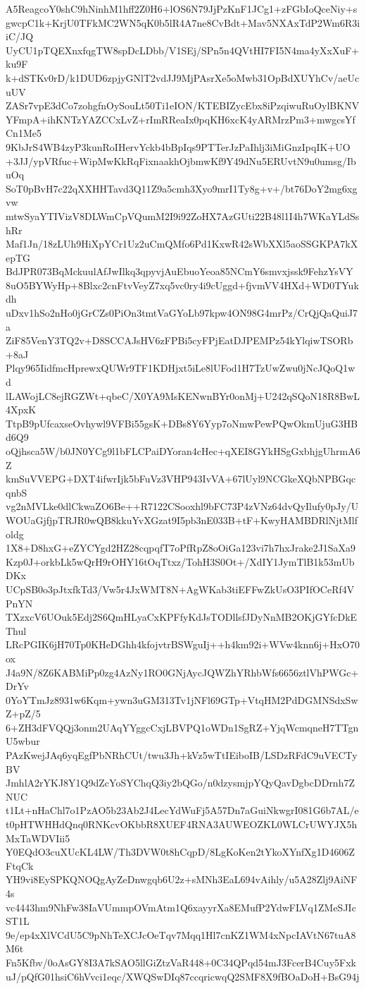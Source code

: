 A5ReagcoY0shC9hNinhM1hff2Z0H6+lOS6N79JjPzKnF1JCg1+zFGbIoQceNiy+s
gwcpC1k+KrjU0TFkMC2WN5qK0b5lR4A7ne8CvBdt+Mav5NXAxTdP2Wm6R3iiC/JQ
UyCU1pTQEXnxfqgTW8spDcLDbb/V1SEj/SPn5n4QVtHI7FI5N4ma4yXxXuF+ku9F
k+dSTKv0rD/k1DUD6zpjyGNlT2vdJJ9MjPAsrXe5oMwb31OpBdXUYhCv/aeUcuUV
ZASr7vpE3dCo7zohgfnOySouLt50Ti1eION/KTEBIZycEbx8iPzqiwuRuOylBKNV
YFmpA+ihKNTzYAZCCxLvZ+rImRReaIx0pqKH6xcK4yARMrzPm3+mwgcsYfCn1Me5
9KbJrS4WB4zyP3kunRoIHervYckb4bBpIqs9PTTerJzPaIhlj3iMiGnzIpqIK+UO
+3JJ/ypVRfuc+WipMwKkRqFixnaakhOjbmwKf9Y49dNu5ERUvtN9u0umsg/IbuOq
SoT0pBvH7c22qXXHHTavd3Q11Z9a5cmh3Xyo9mrI1Ty8g+v+/bt76DoY2mg6xgvw
mtwSyaYTIVizV8DLWmCpVQumM2I9i92ZoHX7AzGUti22B48l1I4h7WKaYLdSshRr
Maf1Jn/18zLUh9HiXpYCr1Uz2uCmQMfo6Pd1KxwR42sWbXXl5aoSSGKPA7kXepTG
BdJPR073BqMckuulAfJwIlkq3qpyvjAuEbuoYeoa85NCmY6smvxjssk9FehzYsVY
8uO5BYWyHp+8Blxc2cnFtvVeyZ7xq5vc0ry4i9cUggd+fjvmVV4HXd+WD0TYukdh
uDxv1hSo2nHo0jGrCZs0PiOn3tmtVaGYoLb97kpw4ON98G4mrPz/CrQjQaQuiJ7a
ZiF85VenY3TQ2v+D8SCCAJsHV6zFPBi5cyFPjEatDJPEMPz54kYlqiwTSORb+8aJ
Plqy965IidfmcHprewxQUWr9TF1KDHjxt5iLe8lUFod1H7TzUwZwu0jNcJQoQ1wd
lLAWojLC8ejRGZWt+qbeC/X0YA9MsKENwnBYr0onMj+U242qSQoN18R8BwL4XpxK
TtpB9pUfcaxseOvhywl9VFBi55gsK+DBs8Y6Yyp7oNmwPewPQwOkmUjuG3HBd6Q9
oQjhsca5W/b0JN0YCg9l1bFLCPaiDYoran4cHec+qXEI8GYkHSgGxbhjgUhrmA6Z
kmSuVVEPG+DXT4ifwrIjk5bFuVz3VHP943IvVA+67lUyl9NCGkeXQbNPBGqcqnbS
vg2nMVLke0dlCkwaZO6Be++R7122CSooxhl9bFC73P4zVNz64dvQyIlufy0pJy/U
WOUaGjfjpTRJR0wQB8kkuYvXGzat9I5pb3nE033B+tF+KwyHAMBDRlNjtMlfoldg
1X8+D8hxG+eZYCYgd2HZ28cqpqfT7oPfRpZ8oOiGa123vi7h7hxJrake2J1SaXa9
Kzp0J+orkbLk5wQrH9rOHY16tOqTtxz/TohH3S0Ot+/XdIY1JymTlB1k53mUbDKx
UCpSB0o3pJtxfkTd3/Vw5r4JxWMT8N+AgWKab3tiEFFwZkUsO3PIfOCeRf4VPnYN
TXzxcV6UOuk5Edj2S6QmHLyaCxKPFfyKdJsTODllsfJDyNnMB2OKjGYfcDkEThul
LRcPGIK6jH70Tp0KHeDGhh4kfojvtrBSWguIj++h4km92i+WVw4knn6j+HxO70ox
J4a9N/8Z6KABMiPp0zg4AzNy1RO0GNjAycJQWZhYRhbWfs6656ztlVhPWGc+DrYv
0YoYTmJz8931w6Kqm+ywn3uGM313Tv1jNFl69GTp+VtqHM2PdDGMNSdxSwZ+pZ/5
6+ZH3dFVQQj3onm2UAqYYggcCxjLBVPQ1oWDn1SgRZ+YjqWcmqneH7TTgnU5wbur
PAzKwejJAq6yqEgfPbNRhCUt/twu3Jh+kVz5wTtIEiboIB/LSDzRFdC9uVECTyBV
JmhlA2rYKJ8Y1Q9dZcYoSYChqQ3iy2bQGo/n0dzysmjpYQyQavDgbcDDrnh7ZNUC
t1Lt+nHaChl7o1PzAO5b23Ab2J4LecYdWuFj5A57Dn7aGuiNkwgrI081G6b7AL/e
t0pHTWHHdQnq0RNKcvOKbbR8XUEF4RNA3AUWEOZKL0WLCrUWYJX5hMxTaWDVIii5
Y0EQdO3cuXUcKL4LW/Th3DVW0t8hCqpD/8LgKoKen2tYkoXYnfXg1D4606ZFtqCk
YH9vi8EySPKQNOQgAyZeDnwgqb6U2z+sMNh3EaL694vAihly/u5A28Zlj9AiNF4s
vc4443hm9NhFw38IaVUmmpOVmAtm1Q6xayyrXa8EMufP2YdwFLVq1ZMeSJIcST1L
9e/ep4xXlVCdU5C9pNhTeXCJcOeTqv7Mqq1Hl7cnKZ1WM4xNpcIAVtN67tuA8M6t
Fn5Kfbv/0oAsGY8I3A7kSAO5llGiZtzVaR448+0C34QPqd54mJ3FcerB4Cuy5Fxk
uJ/pQfG01hsiC6hVvci1eqc/XWQSwDIq87ccqricwqQ2SMF8X9fBOaDoH+BsG94j
